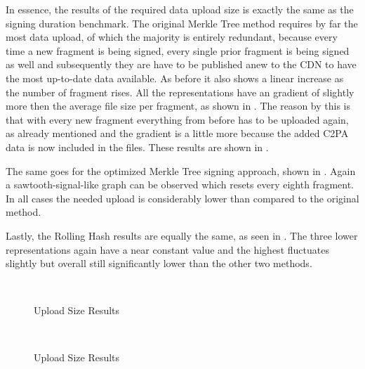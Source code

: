 In essence, the results of the required data upload size is exactly the same as the signing duration benchmark. The original Merkle Tree method requires by far the most data upload, of which the majority is entirely redundant, because every time a new fragment is being signed, every single prior fragment is being signed as well and subsequently they are have to be published anew to the CDN to have the most up-to-date data available. As before it also shows a linear increase as the number of fragment rises. All the representations have an gradient of slightly more then the average file size per fragment, as shown in . The reason by this is that with every new fragment everything from before has to be uploaded again, as already mentioned and the gradient is a little more because the added C2PA data is now included in the files. These results are shown in .

The same goes for the optimized Merkle Tree signing approach, shown in . Again a sawtooth-signal-like graph can be observed which resets every eighth fragment. In all cases the needed upload is considerably lower than compared to the original method.

Lastly, the Rolling Hash results are equally the same, as seen in . The three lower representations again have a near constant value and the highest fluctuates slightly but overall still significantly lower than the other two methods.

\begin{figure}
    \centering
     \\
    \caption{Upload Size Results}
    \label{fig:upload1}
\end{figure}

\begin{figure}
    \centering
     \\
    \caption{Upload Size Results}
    \label{fig:upload2}
\end{figure}

